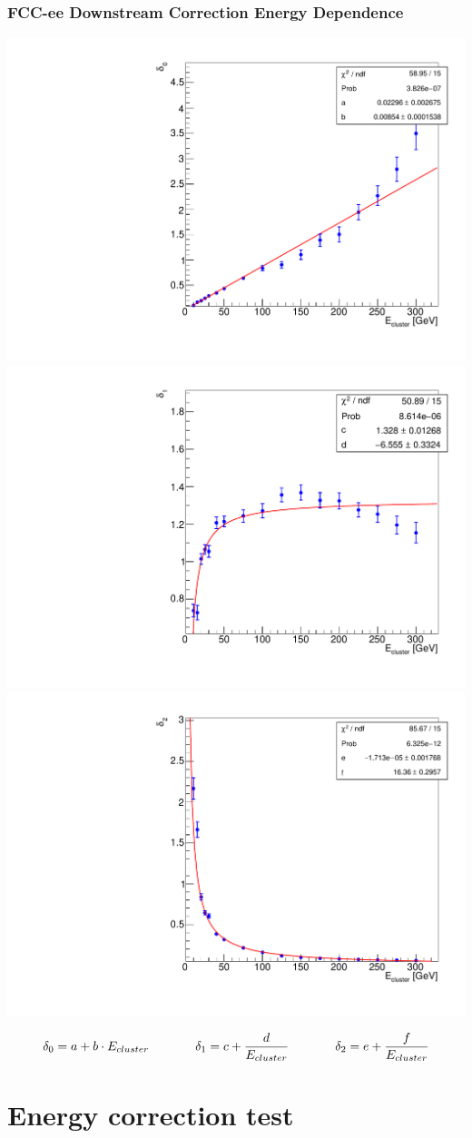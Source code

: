 \documentclass[aspectratio=169]{beamer}
\begin{document}
\begin{frame}
  \frametitle{FCC-ee Downstream Correction Energy Dependence}

  \begin{adjustwidth}{-9mm}{-9mm}
    \includegraphics[width=0.32\linewidth]{figures/12layers/graph_downstream_delta_0.pdf}
    \includegraphics[width=0.32\linewidth]{figures/12layers/graph_downstream_delta_1.pdf}
    \includegraphics[width=0.32\linewidth]{figures/12layers/graph_downstream_delta_2.pdf}\\[-3ex]
  \end{adjustwidth}
  \begin{equation*}
    \delta_0 = a + b \cdot E_{cluster}  \hspace{1.3cm}
    \delta_1 = c + \frac{d}{E_{cluster}} \hspace{1.3cm}
    \delta_2 = e + \frac{f}{E_{cluster}}
  \end{equation*}
\end{frame}


\section{Energy correction test}
\end{document}
